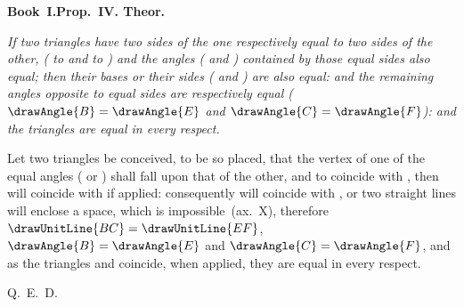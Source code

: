 \documentclass[12pt]{article}
\begin{document}
\noindent
\begin{minipage}[t]{0.45\linewidth}
\centering
\vspace{0pt}%
\drawCurrentPicture
\end{minipage}%
\hfill
\begin{minipage}[t]{0.52\linewidth}
\vspace{0pt}%
\textbf{Book~I.\enspace Prop.\ IV. Theor.}

\medskip

\noindent\itshape
If two triangles have two sides of the one respectively equal to two sides of
the other, ( to  and  to
) and the angles ( and ) contained
by those equal sides also equal; then their bases or their sides
( and ) are also equal: and the remaining
angles opposite to equal sides are respectively equal
($\drawAngle{B} = \drawAngle{E}$ and $\drawAngle{C} = \drawAngle{F}$):
and the triangles are equal in every respect.

\bigskip

\noindent\upshape
Let two triangles be conceived, to be so placed, that the vertex of one of the
equal angles ( or ) shall fall upon that of the
other, and  to coincide with , then will
 coincide with  if applied: consequently
 will coincide with , or two straight lines
will enclose a space, which is impossible~(ax.~X), therefore
$\drawUnitLine{BC} = \drawUnitLine{EF}$,
$\drawAngle{B} = \drawAngle{E}$ and $\drawAngle{C} = \drawAngle{F}$,
and as the triangles  and
 coincide, when applied,
they are equal in every respect.

\begin{flushright}Q.\ E.\ D.\end{flushright}

\end{minipage}
\end{document}
